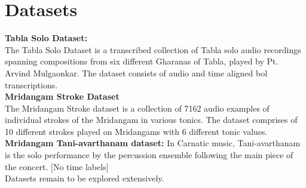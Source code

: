 \chapter{Datasets}

\textbf{Tabla Solo Dataset:} \\ 
The Tabla Solo Dataset is a transcribed collection of Tabla solo audio recordings spanning compositions from six different Gharanas of Tabla, played by Pt. Arvind Mulgaonkar. The dataset consists of audio and time aligned bol transcriptions.  \\ 



\textbf{Mridangam Stroke Dataset} \\ 
The Mridangam Stroke dataset is a collection of 7162 audio examples of individual strokes of the Mridangam in various tonics. The dataset comprises of 10 different strokes played on Mridangams with 6 different tonic values.  \\ 


\textbf{Mridangam Tani-avarthanam dataset:}
In Carnatic music, Tani-avarthanam is the solo performance by the percussion ensemble following the main piece of the concert.
[No time labels] \\ 



Datasets remain to be explored extensively. 
